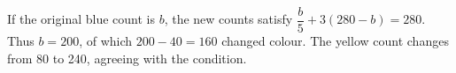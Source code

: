 If the original blue count is $b$, the new counts satisfy $\dfrac{b}{5}+3(280-b)=280$. Thus $b=200$, of which $200-40=\boxed{160}$ changed colour. The yellow count changes from 80 to 240, agreeing with the condition.
